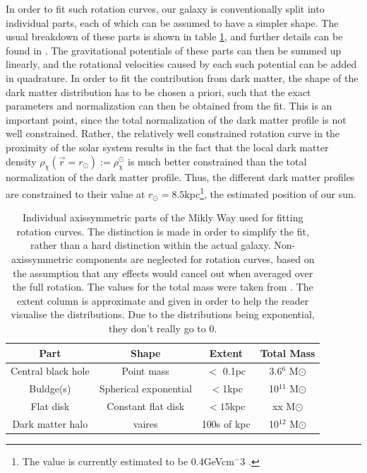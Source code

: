 In order to fit such rotation curves, our galaxy is conventionally split into individual parts, each of which can be assumed to have a simpler shape. The usual breakdown of these parts is shown in table \ref{tab:MilkyWayBreakdown}, and further details can be found in \cite{Sofue_2016}. The gravitational potentials of these parts can then be summed up linearly, and the rotational velocities caused by each such potential can be added in quadrature. In order to fit the contribution from dark matter, the shape of the dark matter distribution has to be chosen a priori, such that the exact parameters and normalization can then be obtained from the fit. This is an important point, since the total normalization of the dark matter profile is not well constrained. Rather, the relatively well constrained rotation curve in the proximity of the solar system results in the fact that the local dark matter density $\rho_\chi(\vec{r}=r_\odot) := \rho_\chi^\odot$ is much better constrained than the total normalization of the dark matter profile. Thus, the different dark matter profiles are constrained to their value at $r_\odot = 8.5$kpc\footnote{The value is currently estimated to be 0.4GeVcm$^-3$ \cite{}.}, the estimated position of our sun. \\
\begin{table}[h]
    \centering
    \begin{tabular}{|c|c|c|c|}
        \hline
        Part & Shape & Extent & Total Mass \\
        \hline
        Central black hole & Point mass & $<$ 0.1pc & 3.6\times 10$^6$ M$\odot$ \\
        \hline
        Buldge(s) & Spherical exponential & $<$1kpc & 10$^11$ M$\odot$ \\
        \hline
        Flat disk & Constant flat disk & $<15$kpc & xx M$\odot$ \\
        \hline
        Dark matter halo & vaires & 100s of kpc & 10$^12$ M$\odot$ \\
        \hline
    \end{tabular}
    \label{tab:MilkyWayBreakdown}
    \caption{Individual axissymmetric parts of the Mikly Way used for fitting rotation curves. The distinction is made in order to simplify the fit, rather than a hard distinction within the actual galaxy. Non-axissymmetric components are neglected for rotation curves, based on the assumption that any effects would cancel out when averaged over the full rotation. The values for the total mass were taken from \cite{Sofue_2016}. The extent column is approximate and given in order to help the reader visualise the distributions. Due to the distributions being exponential, they don't really go to 0.}

\end{table}

